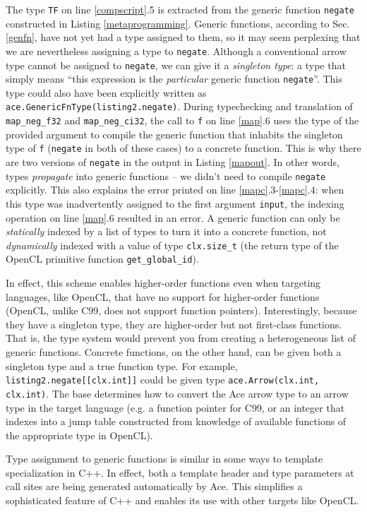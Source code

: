 \documentclass[9pt,preprint]{sigplanconf}
\begin{document}
The type \verb|TF| on line \ref{compscript}.5 is extracted from the generic function \verb|negate| constructed in Listing \ref{metaprogramming}. Generic functions, according to Sec. \ref{genfn}, have not yet had a type assigned to them, so it may seem perplexing that we are nevertheless assigning a type to \verb|negate|. Although a conventional arrow type cannot be assigned to \verb|negate|, we can give it a \emph{singleton type}: a type that simply means ``this expression is the \emph{particular} generic function \verb|negate|''. This type could also have been explicitly written as \verb|ace.GenericFnType(listing2.negate)|. During typechecking and translation of \verb|map_neg_f32| and \verb|map_neg_ci32|, the call to \verb|f| on line \ref{map}.6 uses the type of the provided argument to compile the generic function that inhabits the singleton type of \verb|f| (\verb|negate| in both of these cases) to a concrete function. This is why there are two versions of \verb|negate| in the output in Listing \ref{mapout}. In other words, types \emph{propagate} into generic functions -- we didn't need to compile \verb|negate| explicitly. This also explains the error printed on line \ref{mapc}.3-\ref{mapc}.4: when this type was inadvertently assigned to the first argument \verb|input|, the indexing operation on line \ref{map}.6 resulted in an error. A generic function can only be \emph{statically} indexed by a list of types to turn it into a concrete function, not \emph{dynamically} indexed with a value of type \verb|clx.size_t| (the return type of the OpenCL primitive function \verb|get_global_id|).

In effect, this scheme enables higher-order functions even when targeting languages, like OpenCL, that have no support for higher-order functions (OpenCL, unlike C99, does not support function pointers). Interestingly, because they have a singleton type, they are higher-order but not first-class functions. That is, the type system would prevent you from creating a heterogeneous list of generic functions. Concrete functions, on the other hand, can be given both a singleton type and a true function type. For example, \verb|listing2.negate[[clx.int]]| could be given type \verb|ace.Arrow(clx.int, clx.int)|. The base determines how to convert the Ace arrow type to an arrow type in the target language (e.g. a function pointer for C99, or an integer that indexes into a jump table constructed from knowledge of available functions of the appropriate type in OpenCL).

Type assignment to generic functions is similar in some ways to template specialization in C++. In effect, both a template header and type parameters at call sites are being generated automatically by Ace. This simplifies a sophisticated feature of C++ and enables its use with other targets like OpenCL. %
\end{document}
